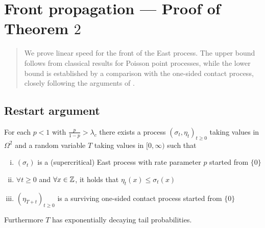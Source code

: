 \section{Front propagation --- Proof of Theorem $2$}

\begin{quote}
{\small We prove linear speed for the front of the East process. The upper bound follows from classical results for Poisson point processes, while the lower bound is established by a comparison with the one-sided contact process, closely following the arguments of \cite{blondel2018front}. }
\end{quote}

\subsection{Restart argument}

\begin{theorem}\label{thm:restart_coupling}
For each $p < 1$ with $\frac{p}{1-p} > \lambda_c$ there exists a process $(\sigma_t, \eta_t)_{t \geq 0}$ taking values in $\Omega^2$ and a random variable $T$ taking values in $[0, \infty)$ such that 
\begin{enumerate}[(i)]
  \item $(\sigma_t)$ is a (supercritical) East process with rate parameter $p$ started from $\{0\}$
  \item $\forall t \geq 0$ and $\forall x \in \mathbb{Z}$, it holds that $\eta_t(x) \leq \sigma_t(x)$
  \item $(\eta_{T+t})_{t \geq 0}$ is a surviving one-sided contact process started from $\{0\}$
\end{enumerate}
Furthermore $T$ has exponentially decaying tail probabilities. 
\end{theorem}

